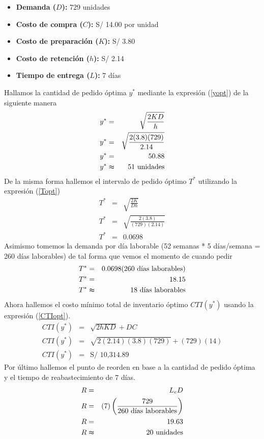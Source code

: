 \begin{itemize}
    \item \textbf{Demanda ($D$):} 729 unidades
    \item \textbf{Costo de compra ($C$):} S/ 14.00 por unidad
    \item \textbf{Costo de preparación ($K$):} S/ 3.80
    \item \textbf{Costo de retención ($h$):} S/ 2.14
    \item \textbf{Tiempo de entrega ($L$):} 7 días
\end{itemize}

Hallamos la cantidad de pedido óptima $y^*$ mediante la expresión (\ref{yopt}) de la siguiente manera
\clearpage
\begin{eqnarray}
    y^* &=& \sqrt{\frac{2KD}{h}} \nonumber \\
    y^* &=& \sqrt{\frac{2(3.8)(729)}{2.14}} \nonumber \\
    y^* &=& 50.88 \nonumber \\
    y^* &\thickapprox& 51 \text{ unidades} \nonumber
\end{eqnarray}
De la misma forma hallemos el intervalo de pedido óptimo $T^*$ utilizando la expresión (\ref{Topt}) 
\begin{eqnarray}
    T^* &=& \sqrt{\frac{2K}{Dh}} \nonumber \\
    T^* &=& \sqrt{\frac{2(3.8)}{(729)(2.14)}} \nonumber \\
    T^* &=& 0.0698 \nonumber
\end{eqnarray}
Asimismo tomemos la demanda por día laborable (52 semanas * 5 días/semana = 260 días laborables) de tal forma que vemos el momento de cuando pedir
\begin{eqnarray}
    T^* &=& 0.0698 (260 \text{ días laborables}) \nonumber \\   
    T^* &=& 18.15 \nonumber \\
    T^* &\thickapprox& 18 \text{ días laborables} \nonumber
\end{eqnarray}
Ahora hallemos el costo mínimo total de inventario óptimo $CTI(y^*)$ usando la expresión (\ref{CTIopt}).
\begin{eqnarray}
    CTI(y^*) &=& \sqrt{2hKD} + DC \nonumber \\
    CTI(y^*) &=& \sqrt{2(2.14)(3.8)(729)} + (729)(14) \nonumber \\
    CTI(y^*) &=& \text{S/ 10,314.89} \nonumber
\end{eqnarray}
Por último hallemos el punto de reorden en base a la cantidad de pedido óptima y el tiempo de reabastecimiento de 7 días.
\clearpage
\begin{eqnarray}
    R &=& L_e D \nonumber \\
    R &=& (7) \left(\frac{729}{260 \text{ días laborables}} \right) \nonumber \\
    R &=& 19.63 \nonumber \\
    R &\thickapprox& 20 \text{ unidades} \nonumber
\end{eqnarray}

